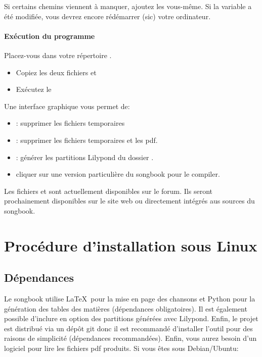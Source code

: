\documentclass[versionenligne]{framabook}
\newcommand{\Touche}[1]{\Ovalbox{#1}}
\begin{document}
Si certains chemins viennent à manquer, ajoutez les vous-même. Si la
variable a été modifiée, vous devrez encore rédémarrer (sic) votre
ordinateur.

\paragraph{Exécution du programme}
Placez-vous dans votre répertoire .
\begin{itemize}
\item Copiez les deux fichiers  et 
\item Exécutez le 
\end{itemize}

 Une interface graphique vous permet de:
\begin{itemize}
\item \Touche{Clean}: supprimer les fichiers temporaires
\item \Touche{Clean All}: supprimer les fichiers temporaires et les pdf. 
\item \Touche{Make Lilypond}: générer les partitions Lilypond du dossier .
\item cliquer sur une version particulière du songbook pour le compiler.
\end{itemize}

\begin{nota}
  Les fichiers  et  sont actuellement disponibles sur le forum. Ils seront prochainement disponibles sur le site web ou directement intégrés aus sources du songbook.
\end{nota}

\section{Procédure d'installation sous Linux}

\subsection{Dépendances}\label{sec:songbook-dep}

Le songbook utilise \LaTeX\, pour la mise en page des chansons et Python
pour la génération des tables des matières (dépendances obligatoires).
Il est également possible d'inclure en option des partitions générées
avec Lilypond. Enfin, le projet est distribué via un dépôt git donc il
est recommandé d'installer l'outil pour des raisons de simplicité
(dépendances recommandées). Enfin, vous aurez besoin d'un logiciel
pour lire les fichiers pdf produits. Si vous êtes sous Debian/Ubuntu:
\end{document}
